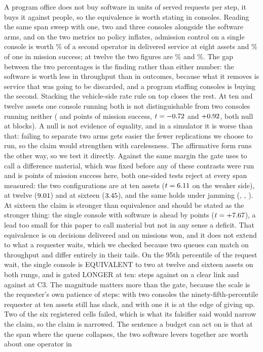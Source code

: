 \documentclass[11pt]{article}
\begin{document}
A program office does not buy software in units of served requests per step, it buys it against people, so the equivalence is worth stating in consoles. Reading the same span sweep with one, two and three consoles alongside the software arms, and on the two metrics no policy inflates, admission control on a single console is worth \seClearSrvNEightShare\% of a second operator in delivered service at eight assets and \seClearSucNEightShare\% of one in mission success; at twelve the two figures are \seClearSrvNTwelveShare\% and \seClearSucNTwelveShare\%. The gap between the two percentages is the finding rather than either number: the software is worth less in throughput than in outcomes, because what it removes is service that was going to be discarded, and a program staffing consoles is buying the second. Stacking the vehicle-side rate rule on top closes the rest. At ten and twelve assets one console running both is not distinguishable from two consoles running neither (\seClearStackNTen{} and \seClearStackNTwelve{} points of mission success, $t = -0.72{}$ and $+0.92{}$, both null at \seClearBlocks{} blocks). A null is not evidence of equality, and in a simulator it is worse than that: failing to separate two arms gets easier the fewer replications we choose to run, so the claim would strengthen with carelessness. The affirmative form runs the other way, so we test it directly. Against the same margin the gate uses to call a difference material, which was fixed before any of these contrasts were run and is \seClearStackNTwelveMarg{} points of mission success here, both one-sided tests reject at every span measured: the two configurations are \seClearStackNTenEq{} at ten assets ($t = 6.11{}$ on the weaker side), \seClearStackNTwelveEq{} at twelve ($9.01{}$) and \seClearStackNSixteenEq{} at sixteen ($3.45{}$), and the same holds under jamming (\seJamStackNTenEqT{}, \seJamStackNTwelveEqT{}, \seJamStackNSixteenEqT{}). At sixteen the claim is stronger than equivalence and should be stated as the stronger thing: the single console with software is ahead by \seClearStackNSixteen{} points ($t = +7.67{}$), a lead too small for this paper to call material but not in any sense a deficit. That equivalence is on decisions delivered and on missions won, and it does not extend to what a requester waits, which we checked because two queues can match on throughput and differ entirely in their tails. On the 95th percentile of the request wait, the single console is EQUIVALENT to two at twelve and sixteen assets on both rungs, and is gated LONGER at ten: \seClearTailNTenOne{} steps against \seClearTailNTenTwo{} on a clear link and \seJamTailNTenOne{} against \seJamTailNTenTwo{} at C3. The magnitude matters more than the gate, because the scale is the requester's own patience of \qDeadlineP{} steps: with two consoles the ninety-fifth-percentile requester at ten assets still has slack, and with one it is at the edge of giving up. Two of the six registered cells failed, which is what its falsifier said would narrow the claim, so the claim is narrowed. The sentence a budget can act on is that at the span where the queue collapses, the two software levers together are worth about one operator in 
\end{document}
